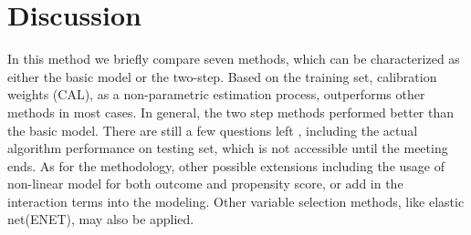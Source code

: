\documentclass[11pt, oneside]{article}
\begin{document}
\section{Discussion}\label{sec:disc}
In this method we briefly compare seven methods, which can be characterized as either the basic model or the two-step. Based on the training set, calibration weights (CAL), as a non-parametric estimation process, outperforms other methods in most cases. In general, the two step methods performed better than the basic model. There are still a few questions left , including the actual algorithm performance on testing set, which is not accessible until the meeting ends. As for the methodology, other possible extensions including the usage of non-linear model for both outcome and propensity score, or add in the interaction terms into the modeling. Other variable selection methods, like elastic net(ENET), may also be applied. 

%
%
\newpage
\end{document}
